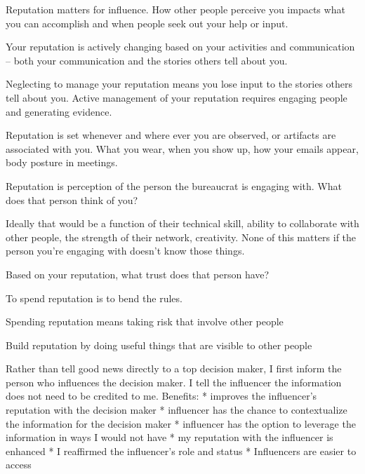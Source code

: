 
Reputation matters for influence. How other people perceive you impacts what you can accomplish and when people seek out your help or input.

Your reputation is actively changing based on your activities and communication -- both your communication and the stories others tell about you.

Neglecting to manage your reputation means you lose input to the stories others tell about you. Active management of your reputation requires engaging people and generating evidence. 

Reputation is set whenever and where ever you are observed, or artifacts are associated with you. What you wear, when you show up, how your emails appear, body posture in meetings. 


Reputation is perception of the person the bureaucrat is engaging with.  What does that person think of you?

Ideally that would be a function of their technical skill, ability to collaborate with other people, the strength of their network, creativity. None of this matters if the person you're engaging with doesn't know those things. 

Based on your reputation, what trust does that person have? 

To spend reputation is to bend the rules. 

Spending reputation means taking risk that involve other people

Build reputation by doing useful things that are visible to other people



Rather than tell good news directly to a top decision maker, I first inform the person who influences the decision maker. I tell the influencer the information does not need to be credited to me.
Benefits:
* improves the influencer's reputation with the decision maker
* influencer has the chance to contextualize the information for the decision maker
* influencer has the option to leverage the information in ways I would not have
* my reputation with the influencer is enhanced
* I reaffirmed the influencer's role and status
* Influencers are easier to access